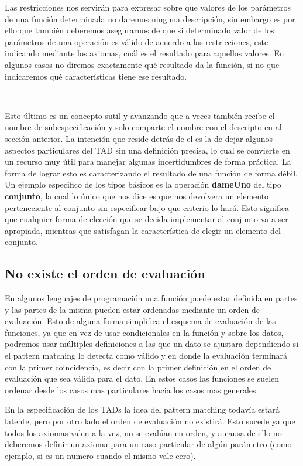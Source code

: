 Las restricciones nos servir\'an para expresar sobre que valores de los par\'ametros de una funci\'on determinada no daremos ninguna descripci\'on, sin embargo es por ello que tambi\'en deberemos asegurarnos de que si determinado valor de los par\'ametros de una operaci\'on es v\'alido de acuerdo a las restricciones, este indicando mediante los axiomas, cu\'al es el resultado para aquellos valores. En algunos casos no diremos exactamente qu\'e resultado da la funci\'on, si no que indicaremos qu\'e caracter\'isticas tiene ese resultado.

~

Esto \'ultimo es un concepto sutil y avanzando que a veces tambi\'en recibe el nombre de subespecificaci\'on y solo comparte el nombre con el descripto en al secci\'on anterior. La intenci\'on que reside detr\'as de el es la de dejar algunos aspectos particulares del TAD sin una definici\'on precisa, lo cual se convierte en un recurso muy \'util para manejar algunas incertidumbres de forma pr\'actica. La forma de lograr esto es caracterizando el resultado de una funci\'on de forma d\'ebil. Un ejemplo especifico de los tipos b\'asicos es la operaci\'on \textbf{dameUno} del tipo \textbf{conjunto}, la cual lo \'unico que nos dice es que nos devolvera un elemento perteneciente al conjunto sin especificar bajo que criterio lo har\'a. Esto significa que cualquier forma de elecci\'on que se decida implementar al conjunto va a ser apropiada, mientras que satisfagan la caracter\'istica de elegir un elemento del conjunto.

\subsection{No existe el orden de evaluaci\'on}
En algunos lenguajes de programaci\'on una funci\'on puede estar definida en partes y las partes de la misma pueden estar ordenadas mediante un orden de evaluaci\'on. Esto de alguna forma simplifica el esquema de evaluaci\'on de las funciones, ya que en vez de usar condicionales en la funci\'on y sobre los datos, podremos usar m\'ultiples definiciones a las que un dato se ajustara dependiendo si el pattern matching lo detecta como v\'alido y en donde la evaluaci\'on terminar\'a con la primer coincidencia, es decir con la primer definici\'on en el orden de evaluaci\'on que sea v\'alida para el dato. En estos casos las funciones se suelen ordenar desde los casos mas particulares hacia los casos mas generales.

En la especificaci\'on de los TADs la idea del pattern matching todav\'ia estar\'a latente, pero por otro lado el orden de evaluaci\'on no existir\'a. Esto sucede ya que todos los axiomas valen a la vez, no se eval\'uan en orden, y a causa de ello no deberemos definir un axioma para un caso particular de alg\'un par\'ametro (como ejemplo, si es un numero cuando el mismo vale cero).

